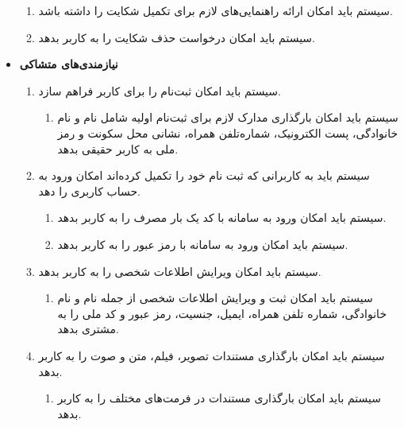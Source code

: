 \documentclass[12pt,a4paper,oneside]{article}
\begin{document}
\begin{itemize}
\begin{enumerate}
        \item 
        سیستم باید امکان ارائه راهنمایی‌های لازم برای تکمیل شکایت را داشته باشد.

        \item 
        سیستم باید امکان درخواست حذف شکایت را به کاربر بدهد.
    \end{enumerate}

    \item
    \textbf{نیازمندی‌های متشاکی}
    \begin{enumerate}
        \renewcommand{\labelenumi}{\textbf{.R\arabic{enumi}}}
        \setcounter{enumi}{21}

		
        \item 
        سیستم باید امکان ثبت‌نام را برای کاربر فراهم سازد.
        \begin{enumerate}
            \renewcommand{\labelenumii}{\textbf{.R\arabic{enumi}.\arabic{enumii}}}
            \item 
            سیستم باید امکان بارگذاری مدارک لازم برای ثبت‌نام اولیه شامل نام و نام خانوادگی، پست الکترونیک، شماره‌تلفن همراه، نشانی محل سکونت و رمز ملی به کاربر حقیقی بدهد.
        \end{enumerate}

        \item 
        سیستم باید به کاربرانى که ثبت نام خود را تکمیل کرده‌اند امکان ورود به حساب کاربری را دهد.
        \begin{enumerate}
            \renewcommand{\labelenumii}{\textbf{.R\arabic{enumi}.\arabic{enumii}}}
            \item 
            سیستم باید امکان ورود به سامانه با کد یک بار مصرف را به کاربر بدهد.
            \item 
            سیستم باید امکان ورود به سامانه با رمز عبور را به کاربر بدهد.
        \end{enumerate}

        \item 
        سیستم باید امکان ویرایش اطلاعات شخصى را به کاربر بدهد.
        \begin{enumerate}
            \renewcommand{\labelenumii}{\textbf{.R\arabic{enumi}.\arabic{enumii}}}
            \item 
            سیستم باید امکان ثبت و ویرایش اطلاعات شخصى از جمله نام و نام خانوادگی، شماره تلفن همراه، ایمیل، جنسیت، رمز عبور و کد ملى را به مشتری بدهد.
        \end{enumerate}

        \item 
        سیستم باید امکان بارگذاری مستندات تصویر، فیلم، متن و صوت را به کاربر بدهد.
        \begin{enumerate}
            \renewcommand{\labelenumii}{\textbf{.R\arabic{enumi}.\arabic{enumii}}}
            \item 
            سیستم باید امکان بارگذاری مستندات در فرمت‌های مختلف را به کاربر بدهد.
        \end{enumerate}


\end{enumerate}
\end{itemize}
\end{document}

